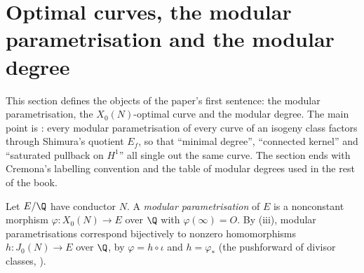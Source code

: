 \section[Optimal curves and the modular degree]{Optimal curves, the modular parametrisation and the modular degree}\label{sec:moddeg:optimal}

This section defines the objects of the paper's first sentence: the modular parametrisation, the $X_0(N)$-optimal curve and the modular degree. The main point is
: every modular parametrisation of every curve of an isogeny class factors through Shimura's quotient $E_f$, so that ``minimal degree'',
``connected kernel'' and ``saturated pullback on $H^1$'' all single out the same curve. The section ends with Cremona's labelling convention and the table of modular
degrees used in the rest of the book.

\begin{definition}\label{def:moddeg:parametrisation}
Let $E/\Q$ have conductor $N$. A \emph{modular parametrisation} of $E$ is a nonconstant morphism $\varphi\colon X_0(N)\to E$ over $\Q$ with $\varphi(\infty)=O$. By
(iii), modular parametrisations correspond bijectively to nonzero homomorphisms $h\colon J_0(N)\to E$ over $\Q$, by $\varphi=h\circ\iota$ and $h=\varphi_*$ (the
pushforward of divisor classes, ).
\end{definition}

